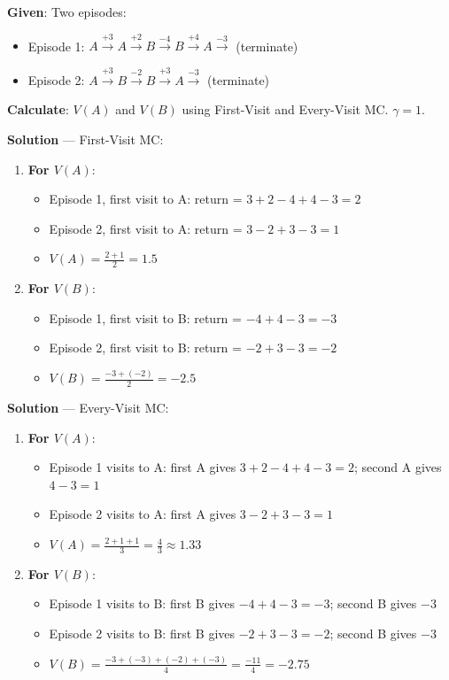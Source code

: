 \documentclass[11pt,a4paper]{article}
\begin{document}
\begin{tcolorbox}[colback=blue!5!white,colframe=blue!75!black,title=\textbf{Worked Example 28: First-Visit vs Every-Visit MC}]
\textbf{Given}: Two episodes:
\begin{itemize}
    \item Episode 1: $A \xrightarrow{+3} A \xrightarrow{+2} B \xrightarrow{-4} B \xrightarrow{+4} A \xrightarrow{-3}$ (terminate)
    \item Episode 2: $A \xrightarrow{+3} B \xrightarrow{-2} B \xrightarrow{+3} A \xrightarrow{-3}$ (terminate)
\end{itemize}

\textbf{Calculate}: $V(A)$ and $V(B)$ using First-Visit and Every-Visit MC. $\gamma = 1$.

\textbf{Solution} --- First-Visit MC:
\begin{enumerate}
    \item \textbf{For $V(A)$}:
    \begin{itemize}
        \item Episode 1, first visit to A: return = $3 + 2 - 4 + 4 - 3 = 2$
        \item Episode 2, first visit to A: return = $3 - 2 + 3 - 3 = 1$
        \item $V(A) = \frac{2 + 1}{2} = 1.5$
    \end{itemize}
    \item \textbf{For $V(B)$}:
    \begin{itemize}
        \item Episode 1, first visit to B: return = $-4 + 4 - 3 = -3$
        \item Episode 2, first visit to B: return = $-2 + 3 - 3 = -2$
        \item $V(B) = \frac{-3 + (-2)}{2} = -2.5$
    \end{itemize}
\end{enumerate}

\textbf{Solution} --- Every-Visit MC:
\begin{enumerate}
    \item \textbf{For $V(A)$}:
    \begin{itemize}
        \item Episode 1 visits to A: first A gives $3+2-4+4-3 = 2$; second A gives $4-3 = 1$
        \item Episode 2 visits to A: first A gives $3-2+3-3 = 1$
        \item $V(A) = \frac{2 + 1 + 1}{3} = \frac{4}{3} \approx 1.33$
    \end{itemize}
    \item \textbf{For $V(B)$}:
    \begin{itemize}
        \item Episode 1 visits to B: first B gives $-4+4-3 = -3$; second B gives $-3$
        \item Episode 2 visits to B: first B gives $-2+3-3 = -2$; second B gives $-3$
        \item $V(B) = \frac{-3 + (-3) + (-2) + (-3)}{4} = \frac{-11}{4} = -2.75$
    \end{itemize}
\end{enumerate}


\end{tcolorbox}
\end{document}
